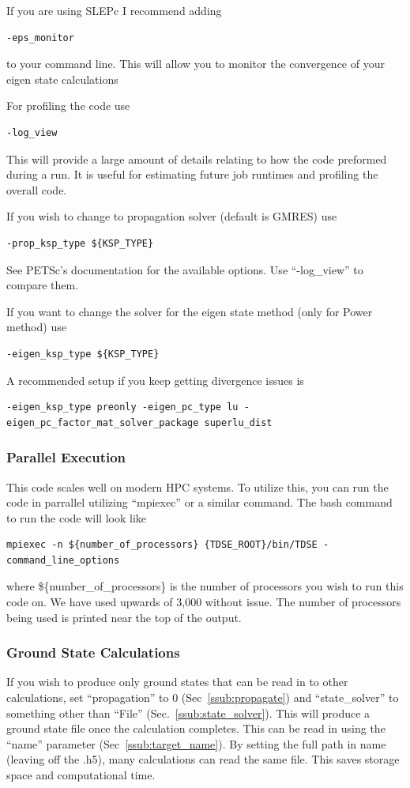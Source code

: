 \documentclass{article}
\begin{document}
If you are using SLEPc I recommend adding
\begin{verbatim}
-eps_monitor
\end{verbatim}
to your command line. This will allow you to monitor the convergence of your eigen state calculations

For profiling the code use
\begin{verbatim}
-log_view
\end{verbatim}
This will provide a large amount of details relating to how the code preformed during a run. It is useful for estimating future job runtimes and profiling the overall code.

If you wish to change to propagation solver (default is GMRES) use
\begin{verbatim}
-prop_ksp_type ${KSP_TYPE}
\end{verbatim}
See PETSc's documentation for the available options. Use ``-log\_view'' to compare them.

If you want to change the solver for the eigen state method (only for Power method) use
\begin{verbatim}
-eigen_ksp_type ${KSP_TYPE}
\end{verbatim}
A recommended setup if you keep getting divergence issues is
\begin{verbatim}
-eigen_ksp_type preonly -eigen_pc_type lu -eigen_pc_factor_mat_solver_package superlu_dist
\end{verbatim}

\subsubsection{Parallel Execution} %
\label{ssub:parallel_execution}
This code scales well on modern HPC systems. To utilize this, you can run the code in parrallel utilizing ``mpiexec'' or a similar command. The bash command to run the code will look like
\begin{verbatim}
mpiexec -n ${number_of_processors} {TDSE_ROOT}/bin/TDSE -command_line_options
\end{verbatim}
where \$\{number\_of\_processors\} is the number of processors you wish to run this code on. We have used upwards of 3,000 without issue. The number of processors being used is printed near the top of the output.

\subsubsection{Ground State Calculations} %
\label{ssub:ground_state_calculations}
If you wish to produce only ground states that can be read in to other calculations, set ``propagation'' to 0 (Sec~\ref{ssub:propagate}) and ``state\_solver'' to something other than ``File'' (Sec.~\ref{ssub:state_solver}). This will produce a ground state file once the calculation completes. This can be read in using the ``name'' parameter (Sec~\ref{ssub:target_name}). By setting the full path in name (leaving off the .h5), many calculations can read the same file. This saves storage space and computational time.
\end{document}
